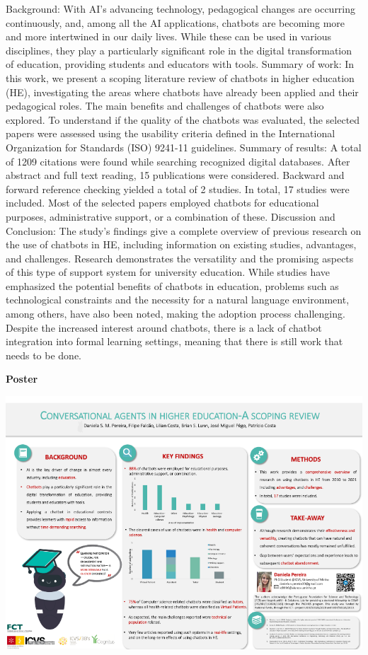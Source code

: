 \documentclass[
]{book}
\begin{document}
Background: With AI's advancing technology, pedagogical changes are occurring continuously, and, among all the AI applications, chatbots are becoming more and more intertwined in our daily lives. While these can be used in various disciplines, they play a particularly significant role in the digital transformation of education, providing students and educators with tools. Summary of work: In this work, we present a scoping literature review of chatbots in higher education (HE), investigating the areas where chatbots have already been applied and their pedagogical roles. The main benefits and challenges of chatbots were also explored. To understand if the quality of the chatbots was evaluated, the selected papers were assessed using the usability criteria defined in the International Organization for Standards (ISO) 9241-11 guidelines. Summary of results: A total of 1209 citations were found while searching recognized digital databases. After abstract and full text reading, 15 publications were considered. Backward and forward reference checking yielded a total of 2 studies. In total, 17 studies were included. Most of the selected papers employed chatbots for educational purposes, administrative support, or a combination of these. Discussion and Conclusion: The study's findings give a complete overview of previous research on the use of chatbots in HE, including information on existing studies, advantages, and challenges. Research demonstrates the versatility and the promising aspects of this type of support system for university education. While studies have emphasized the potential benefits of chatbots in education, problems such as technological constraints and the necessity for a natural language environment, among others, have also been noted, making the adoption process challenging. Despite the increased interest around chatbots, there is a lack of chatbot integration into formal learning settings, meaning that there is still work that needs to be done.

\textbf{Poster}

\includegraphics{Content/DEA2.png}
\end{document}
